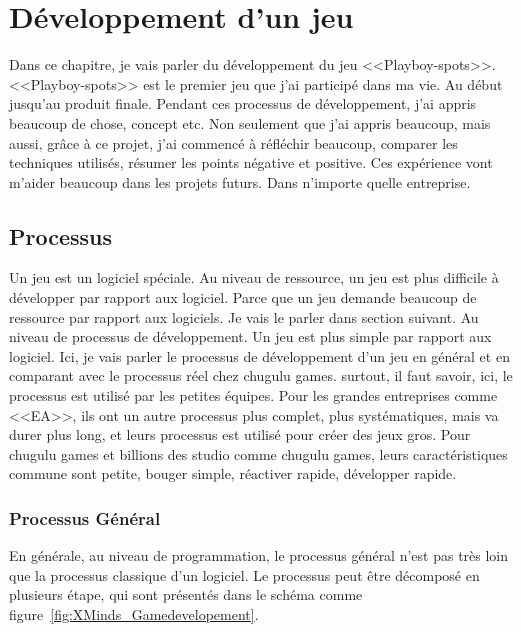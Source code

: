 \chapter{Développement d'un jeu} %
\label{cha:développement_d_un_jeu}

Dans ce chapitre, je vais parler du développement du jeu <<Playboy-spots>>. <<Playboy-spots>> est le premier jeu que j'ai participé dans ma vie. Au début jusqu'au produit finale. Pendant ces processus de développement, j'ai appris beaucoup de chose, concept etc. Non seulement que j'ai appris beaucoup, mais aussi, grâce à ce projet, j'ai commencé à réfléchir beaucoup, comparer les techniques utilisés, résumer les points négative et positive. Ces expérience vont m'aider beaucoup dans les projets futurs. Dans n'importe quelle entreprise.

\section{Processus} %
\label{sec:processus}

Un jeu est un logiciel spéciale. Au niveau de ressource, un jeu est plus difficile à développer par rapport aux logiciel. Parce que un jeu demande beaucoup de ressource par rapport aux logiciels. Je vais le parler dans section suivant. Au niveau de processus de développement. Un jeu est plus simple par rapport aux logiciel. Ici, je vais parler le processus de développement d'un jeu en général et en comparant avec le processus réel chez chugulu games. surtout, il faut savoir, ici, le processus est utilisé par les petites équipes. Pour les grandes entreprises comme <<EA>>, ils ont un autre processus plus complet, plus systématiques, mais va durer plus long, et leurs processus est utilisé pour créer des jeux gros. Pour chugulu games et billions des studio comme chugulu games, leurs caractéristiques commune sont petite, bouger simple, réactiver rapide, développer rapide. 

\subsection{Processus Général} %
\label{sub:processus_général}

En générale, au niveau de programmation, le processus général n'est pas très loin que la processus classique d'un logiciel. Le processus peut être décomposé en plusieurs étape, qui sont présentés dans le schéma comme figure~\ref{fig:XMinds_Gamedevelopement}.

